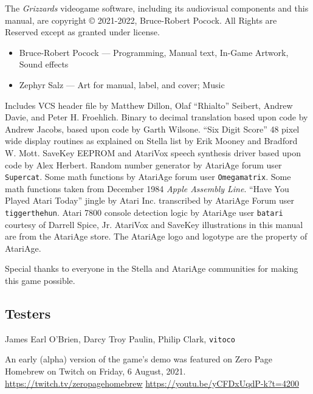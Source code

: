 \documentclass[10pt,twocolumn,openany,article]{memoir}
\begin{document}
\begin{description}
{  The \textit{Grizzards}  videogame software, including  its audiovisual
  components  and this  manual,  are  copyright \copyright{}  2021-2022,
  Bruce-Robert  Pocock.  All  Rights  are  Reserved  except  as  granted
  under license.

\begin{itemize}
\item Bruce-Robert Pocock --- Programming, Manual text, In-Game Artwork,
  Sound effects
\item Zephyr Salz --- Art for manual, label, and cover; Music
\end{itemize}

\bigskip


Includes VCS  header file by  Matthew Dillon, Olaf  ``Rhialto'' Seibert,
Andrew  Davie, and  Peter H.  Froehlich. Binary  to decimal  translation
based upon  code by  Andrew Jacobs,  based upon  code by  Garth Wilsone.
``Six  Digit Score''  48 pixel  wide  display routines  as explained  on
Stella list  by Erik  Mooney and  Bradford W.  Mott. SaveKey  EEPROM and
AtariVox  speech  synthesis driver  based  upon  code by  Alex  Herbert.
Random  number  generator  by  AtariAge  forum  user  \texttt{Supercat}.
Some  math  functions  by AtariAge  forum  user  \texttt{Omega\-matrix}.
Some  math functions  taken  from December  1984 \textit{Apple  Assembly
  Line}.  ``Have  You   Played  Atari  Today''  jingle   by  Atari  Inc.
transcribed by AtariAge Forum user \texttt{tigger\-the\-hun}. Atari 7800
console  detection logic  by AtariAge  user \texttt{batari}  courtesy of
Darrell Spice, Jr. AtariVox and SaveKey illustrations in this manual are
from  the AtariAge  store.  \ifdefined\DEMO\else The  AtariAge logo  and
logotype are the property of AtariAge. \fi

Special thanks  to everyone in  the Stella and AtariAge  communities for
making this game possible.

\subsection{Testers}

James Earl O'Brien,
Darcy Troy Paulin,
Philip Clark,
\texttt{vitoco}

An early  (alpha) version of the  game's demo was featured  on Zero Page
Homebrew     on     Twitch     on    Friday,     6     August,     2021.
\href{https://twitch.tv/zeropagehomebrew}{https://twitch.tv/\-zero\-page\-homebrew}
\href{https://youtu.be/yCFDxUqdP-k?t=4200}{https://youtu.be/\-yCFDxUqdP-k?t=4200}

}
\end{description}
\end{document}
